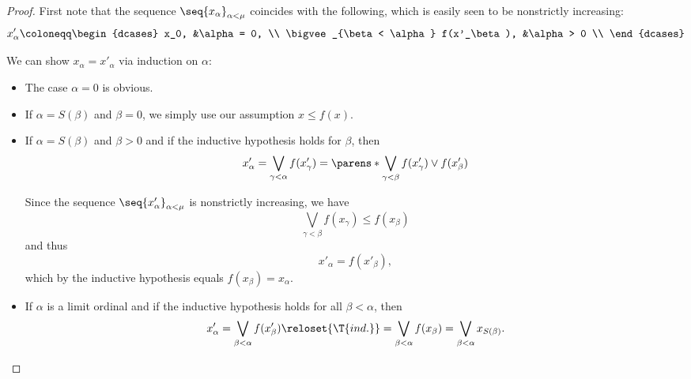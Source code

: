 \begin{proof}
   First note that the sequence \( \seq{ x_\alpha }_{\alpha < \mu} \) coincides with the following, which is easily seen to be nonstrictly increasing:
  \begin{equation*}
    x'_\alpha \coloneqq \begin{dcases}
      x_0,                                  &\alpha = 0, \\
      \bigvee_{\beta < \alpha} f(x'_\beta), &\alpha > 0 \\
    \end{dcases}
  \end{equation*}

   We can show \( x_\alpha = x'_\alpha \) via induction on \( \alpha \):
  \begin{itemize}
    \item The case \( \alpha = 0 \) is obvious.
    \item If \( \alpha = S(\beta) \) and \( \beta = 0 \), we simply use our assumption \( x \leq f(x) \).
    \item If \( \alpha = S(\beta) \) and \( \beta > 0 \) and if the inductive hypothesis holds for \( \beta \), then
    \begin{equation*}
      x'_\alpha
      =
      \bigvee_{\gamma < \alpha} f(x'_\gamma)
      =
      \parens*{ \bigvee_{\gamma < \beta} f(x'_\gamma) } \vee f(x'_\beta)
    \end{equation*}

    Since the sequence \( \seq{ x'_\alpha }_{\alpha < \mu} \) is nonstrictly increasing, we have
    \begin{equation*}
      \bigvee_{\gamma < \beta} f(x_\gamma) \leq f(x_\beta)
    \end{equation*}
    and thus
    \begin{equation*}
      x'_\alpha = f(x'_\beta),
    \end{equation*}
    which by the inductive hypothesis equals \( f(x_\beta) = x_\alpha \).

    \item If \( \alpha \) is a limit ordinal and if the inductive hypothesis holds for all \( \beta < \alpha \), then
    \begin{equation*}
      x'_\alpha
      =
      \bigvee_{\beta < \alpha} f(x'_\beta)
      \reloset {\T{ind.}} =
      \bigvee_{\beta < \alpha} f(x_\beta)
      =
      \bigvee_{\beta < \alpha} x_{S(\beta)}.
    \end{equation*}


\end{itemize}
\end{proof}
